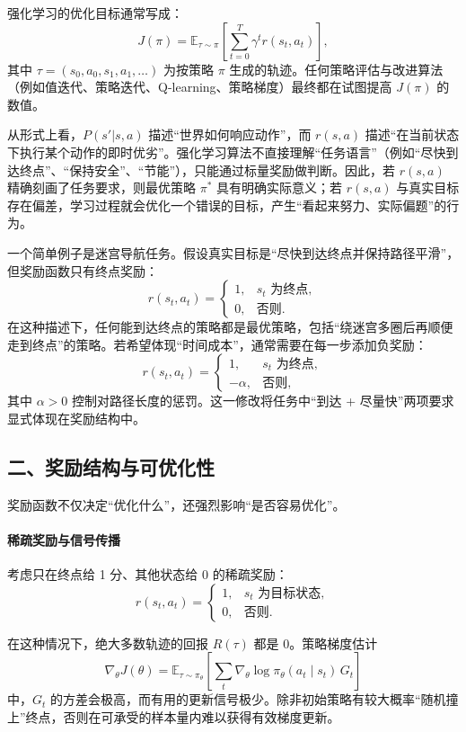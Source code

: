 强化学习的优化目标通常写成：
\[
J(\pi) = \mathbb{E}_{\tau\sim\pi}\left[\sum_{t=0}^{T} \gamma^t r(s_t, a_t)\right],
\]
其中 $\tau=(s_0,a_0,s_1,a_1,\dots)$ 为按策略 $\pi$ 生成的轨迹。任何策略评估与改进算法（例如值迭代、策略迭代、Q-learning、策略梯度）最终都在试图提高 $J(\pi)$ 的数值。

从形式上看，$P(s'|s,a)$ 描述“世界如何响应动作”，而 $r(s,a)$ 描述“在当前状态下执行某个动作的即时优劣”。强化学习算法不直接理解“任务语言”（例如“尽快到达终点”、“保持安全”、“节能”），只能通过标量奖励做判断。因此，若 $r(s,a)$ 精确刻画了任务要求，则最优策略 $\pi^\ast$ 具有明确实际意义；若 $r(s,a)$ 与真实目标存在偏差，学习过程就会优化一个错误的目标，产生“看起来努力、实际偏题”的行为。

一个简单例子是迷宫导航任务。假设真实目标是“尽快到达终点并保持路径平滑”，但奖励函数只有终点奖励：
\[
r(s_t,a_t) =
\begin{cases}
1, & s_t \text{ 为终点},\\
0, & \text{否则}.
\end{cases}
\]
在这种描述下，任何能到达终点的策略都是最优策略，包括“绕迷宫多圈后再顺便走到终点”的策略。若希望体现“时间成本”，通常需要在每一步添加负奖励：
\[
r(s_t,a_t) =
\begin{cases}
1, & s_t \text{ 为终点},\\
- \alpha, & \text{否则},
\end{cases}
\]
其中 $\alpha>0$ 控制对路径长度的惩罚。这一修改将任务中“到达 + 尽量快”两项要求显式体现在奖励结构中。

\subsection*{二、奖励结构与可优化性}

奖励函数不仅决定“优化什么”，还强烈影响“是否容易优化”。

\paragraph{稀疏奖励与信号传播}

考虑只在终点给 1 分、其他状态给 0 的稀疏奖励：
\[
r(s_t,a_t)=
\begin{cases}
1, & s_t \text{ 为目标状态},\\
0, & \text{否则}.
\end{cases}
\]

在这种情况下，绝大多数轨迹的回报 $R(\tau)$ 都是 0。策略梯度估计
\[
\nabla_\theta J(\theta)
= \mathbb{E}_{\tau\sim\pi_\theta}\left[\sum_{t}\nabla_\theta \log \pi_\theta(a_t\mid s_t)\, G_t\right]
\]
中，$G_t$ 的方差会极高，而有用的更新信号极少。除非初始策略有较大概率“随机撞上”终点，否则在可承受的样本量内难以获得有效梯度更新。

